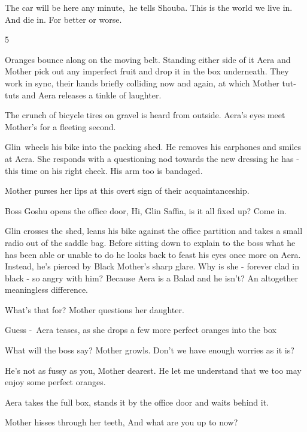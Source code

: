 \documentclass[twoside,11pt]{book}
\begin{document}
{\textquotedbl}The car will be here any minute,{\textquotedbl}~he tells Shouba. {\textquotedbl}This is the world we live
in. And die in. For better or worse.{\textquotedbl}


\bigskip

5 

Oranges bounce along on the moving belt. Standing either side of it Aera and Mother pick out any imperfect fruit and
drop it in the box underneath. They work in sync, their hands briefly colliding now and again, at which Mother tut-tuts
and Aera releases a tinkle of laughter. 

The crunch of bicycle tires on gravel is heard from outside. Aera's eyes meet Mother's for a fleeting second. 

Glin~wheels his bike into the packing shed. He removes his earphones and smiles at Aera. She responds with a questioning
nod towards the new dressing he has - this time on his right cheek. His arm too is bandaged. 

Mother purses her lips at this overt sign of their acquaintanceship.~~~~~~~ 

Boss Goshu opens the office door, {\textquotedbl}Hi, Glin Saffia, is it all fixed up? Come in.{\textquotedbl}

Glin crosses the shed, leans his bike against the office partition and takes a small radio out of the saddle bag. Before
sitting down to explain to the boss what he has been able or unable to do he looks back to feast his eyes once more on
Aera. Instead, he's pierced by Black Mother's sharp glare. Why is she - forever clad in black - so angry with him?
Because Aera is a Balad and he isn't? An altogether meaningless difference.

{\textquotedbl}What's that for?{\textquotedbl} Mother questions her daughter.

{\textquotedbl}Guess -{\textquotedbl}~Aera teases, as she drops a few more perfect oranges into the box

{\textquotedbl}What will the boss say?{\textquotedbl} Mother growls. {\textquotedbl}Don't we have enough worries as it
is?{\textquotedbl} 

{\textquotedbl}He's not as fussy as you, Mother dearest. He let me understand that we too may enjoy some perfect
oranges.{\textquotedbl} 

Aera takes the full box, stands it by the office door and waits behind it.

Mother hisses through her teeth, {\textquotedbl}And what are you up to now?{\textquotedbl}
\end{document}
